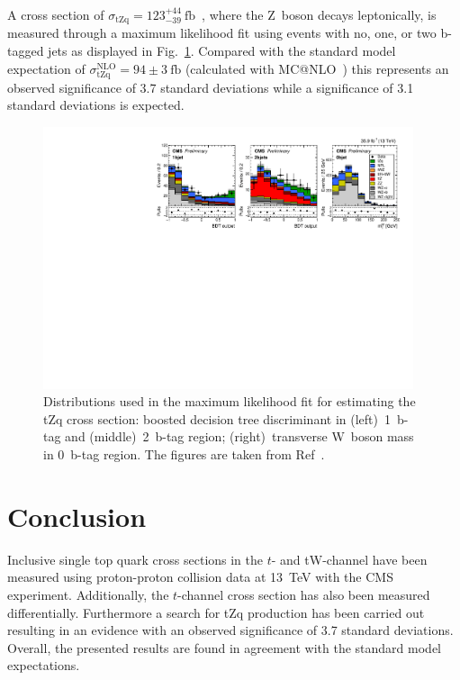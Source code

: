 \documentclass[12pt]{article}
\begin{document}
A cross section of $\sigma_\mathrm{tZq}=123^{+44}_{-39}~\mathrm{fb}$~\cite{tZq-inc}, where the Z~boson decays leptonically, is measured through a maximum likelihood fit using events with no, one, or two b-tagged jets as displayed in Fig.~\ref{fig:tzq}. Compared with the standard model expectation of $\sigma^\mathrm{NLO}_\mathrm{tZq}=94\pm3~\mathrm{fb}$ (calculated with MC{@}NLO~\cite{mcatnlo}) this represents an observed significance of 3.7 standard deviations while a significance of 3.1 standard deviations is expected.

\begin{figure}[!htb]
\begin{center}
\includegraphics[width=0.97\textwidth]{tZq-fit.pdf}
\caption{\label{fig:tzq}Distributions used in the maximum likelihood fit for estimating the tZq cross section: boosted decision tree discriminant in (left)~1~b-tag and (middle)~2~b-tag region; (right)~transverse W~boson mass in 0~b-tag region. The figures are taken from Ref~\cite{tZq-inc}.}
\end{center}
\end{figure}


\section{Conclusion}

Inclusive single top quark cross sections in the $t$- and tW-channel have been measured using proton-proton collision data at 13~TeV with the CMS experiment. Additionally, the $t$-channel cross section has also been measured differentially. Furthermore a search for tZq production has been carried out resulting in an evidence with an observed significance of 3.7 standard deviations. Overall, the presented results are found in agreement with the standard model expectations.
\end{document}
